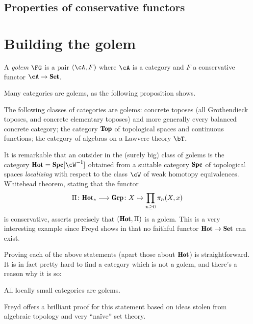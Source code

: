 \documentclass[a4paper,10pt,draft]{amsart}
\begin{document}
\subsection{Properties of conservative functors}
\section{Building the golem}
\begin{definition}
A \textit{golem} $\FG$ is a pair $(\cA,F)$ where $\cA$ is a category and $F$ a conservative functor $\cA \to \Set$.
\end{definition}
Many categories are golems, as the following proposition shows.
\begin{theorem}
The following classes of categories are golems: concrete toposes (\ie all Grothendieck toposes, and concrete elementary toposes) and more generally every balanced concrete category; the category $\cate{Top}$ of topological spaces and continuous functions; the category of algebras on a Lawvere theory $\bT$. 
\end{theorem}
\begin{remark}
It is remarkable that an outsider in the (surely big) class of golems is the category $\cate{Hot} = \cate{Spc}[\cW^{-1}]$ obtained from a suitable category $\cate{Spc}$ of topological spaces \emph{localizing} with respect to the class $\cW$ of weak homotopy equivalences. Whitehead theorem, stating that the functor 
\[
\Pi \colon \cate{Hot}_* \longrightarrow \cate{Grp} \colon X \mapsto \prod_{n\ge 0} \pi_n(X,x)
\]
is conservative, asserts precisely that $(\cate{Hot}, \Pi)$ is a golem. This is a very interesting example since Freyd shows in \cite{Freydconc} that no faithful functor $\cate{Hot}\to \Set$ can exist.
\end{remark}
Proving each of the above statements (apart those about $\cate{Hot}$) is straightforward. It is in fact pretty hard to find a category which is not a golem, and there's a reason why it is so:
\begin{theorem}[\protect{\cite[???]{}}]\label{freyd_uber_trick}
All locally small categories are golems.
\end{theorem}
Freyd offers a brilliant proof for this statement based on ideas stolen from algebraic topology and very ``na\"ive'' set theory.
\end{document}
